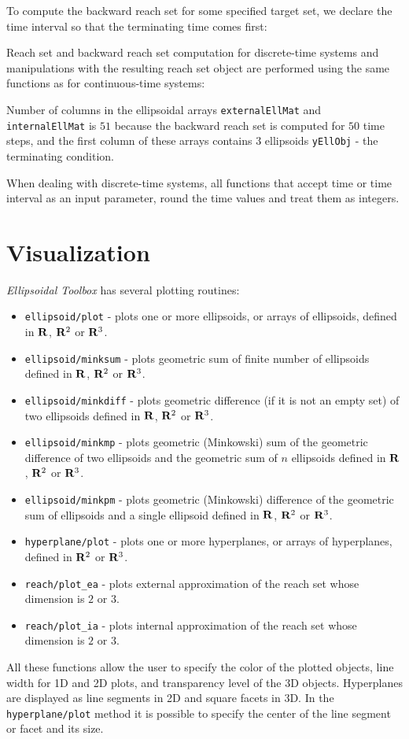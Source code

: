To compute the backward reach set for some specified target set,
we declare the time interval so that the terminating time comes first:

Reach set and backward reach set computation for discrete-time systems and
manipulations with the resulting reach set object are performed using
the same functions as for continuous-time systems:

Number of columns in the ellipsoidal arrays {\tt externalEllMat} and {\tt internalEllMat} is $51$
because the backward reach set is computed for $50$ time steps, and the first
column of these arrays contains $3$ ellipsoids {\tt yEllObj} - the terminating
condition.

When dealing with discrete-time systems, all functions that accept time or
time interval as an input parameter, round the time values and treat them as
integers.

\newpage
\section{Visualization}
{\it Ellipsoidal Toolbox} has several plotting routines:
\begin{itemize}
\item {\tt ellipsoid/plot} - plots one or more ellipsoids, or arrays of
ellipsoids, defined in ${\bf R}$, ${\bf R}^2$ or ${\bf R}^3$.
\item {\tt ellipsoid/minksum} - plots geometric sum of finite number of
ellipsoids defined in ${\bf R}$, ${\bf R}^2$ or ${\bf R}^3$.
\item {\tt ellipsoid/minkdiff} - plots geometric difference
(if it is not an empty set) of two ellipsoids defined in
${\bf R}$, ${\bf R}^2$ or ${\bf R}^3$.
\item {\tt ellipsoid/minkmp} - plots geometric (Minkowski) sum
of the geometric difference of two ellipsoids and the geometric sum of $n$
ellipsoids defined in ${\bf R}$, ${\bf R}^2$ or ${\bf R}^3$.
\item {\tt ellipsoid/minkpm} - plots geometric (Minkowski) difference of the
geometric sum of ellipsoids and a single ellipsoid defined in
${\bf R}$, ${\bf R}^2$ or ${\bf R}^3$.
\item {\tt hyperplane/plot} - plots one or more hyperplanes, or arrays of
hyperplanes, defined in ${\bf R}^2$ or ${\bf R}^3$.
\item {\tt reach/plot\_ea} - plots external approximation of the reach set
whose dimension is $2$ or $3$.
\item {\tt reach/plot\_ia} - plots internal approximation of the reach set
whose dimension is $2$ or $3$.
\end{itemize}
All these functions allow the user to specify the color of the plotted objects,
line width for 1D and 2D plots, and transparency level of the 3D objects.
Hyperplanes are displayed as line segments in 2D and square facets in 3D.
In the {\tt hyperplane/plot} method it is possible to specify the center
of the line segment or facet and its size.

